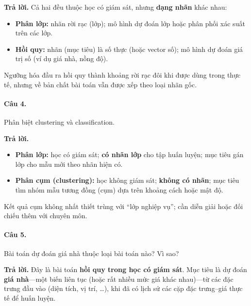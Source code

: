 \medskip\noindent\textbf{Trả lời.} Cả hai đều thuộc học có giám sát, nhưng \textbf{dạng nhãn} khác nhau:
\begin{itemize}[nosep]
\item \textbf{Phân lớp:} nhãn rời rạc (lớp); mô hình dự đoán lớp hoặc phân phối xác suất trên các lớp.
\item \textbf{Hồi quy:} nhãn (mục tiêu) là số thực (hoặc vector số); mô hình dự đoán giá trị số (ví dụ giá nhà, nồng độ).
\end{itemize}
Ngưỡng hóa đầu ra hồi quy thành khoảng rời rạc đôi khi được dùng trong thực tế, nhưng về bản chất bài toán vẫn được xếp theo loại nhãn gốc.

\paragraph{Câu 4.} Phân biệt clustering và classification.

\medskip\noindent\textbf{Trả lời.}
\begin{itemize}[nosep]
\item \textbf{Phân lớp:} học có giám sát; \textbf{có nhãn lớp} cho tập huấn luyện; mục tiêu gán lớp cho mẫu mới theo nhãn hiện có.
\item \textbf{Phân cụm (clustering):} học không giám sát; \textbf{không có nhãn}; mục tiêu tìm nhóm mẫu tương đồng (cụm) dựa trên khoảng cách hoặc mật độ.
\end{itemize}
Kết quả cụm không nhất thiết trùng với ``lớp nghiệp vụ''; cần diễn giải hoặc đối chiếu thêm với chuyên môn.

\paragraph{Câu 5.} Bài toán dự đoán giá nhà thuộc loại bài toán nào? Vì sao?

\medskip\noindent\textbf{Trả lời.} Đây là bài toán \textbf{hồi quy trong học có giám sát}. Mục tiêu là dự đoán \textbf{giá nhà}---một biến liên tục (hoặc rất nhiều mức giá khác nhau)---từ các đặc trưng đầu vào (diện tích, vị trí, \ldots), khi đã có lịch sử các cặp đặc trưng--giá thực tế để huấn luyện.
